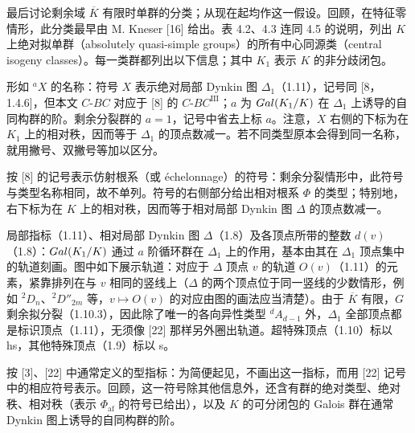 最后讨论剩余域 $\overline K$ 有限时单群的分类；从现在起均作这一假设。回顾，在特征零情形，此分类最早由 M. Kneser [16] 给出。表 4.2、4.3 连同 4.5 的说明，列出 $K$ 上绝对拟单群（absolutely quasi-simple groups）的所有中心同源类（central isogeny classes）。每一类群都列出以下信息；其中 $K_1$ 表示 $K$ 的非分歧闭包。

形如 ${}^aX$ 的名称：符号 $X$ 表示绝对局部 Dynkin 图 $\Delta_1$（1.11），记号同 [8，1.4.6]，但本文 $C$-$BC$ 对应于 [8] 的 $C$-$BC^{\mathrm{III}}$；$a$ 为 $Gal(K_1/K)$ 在 $\Delta_1$ 上诱导的自同构群的阶。剩余分裂群的 $a=1$，记号中省去上标 $a$。注意，$X$ 右侧的下标为在 $K_1$ 上的相对秩，因而等于 $\Delta_1$ 的顶点数减一。若不同类型原本会得到同一名称，就用撇号、双撇号等加以区分。

按 [8] 的记号表示仿射根系（或 échelonnage）的符号：剩余分裂情形中，此符号与类型名称相同，故不单列。符号的右侧部分给出相对根系 $\Phi$ 的类型；特别地，右下标为在 $K$ 上的相对秩，因而等于相对局部 Dynkin 图 $\Delta$ 的顶点数减一。

局部指标（1.11）、相对局部 Dynkin 图 $\Delta$（1.8）及各顶点所带的整数 $d(v)$（1.8）：$Gal(K_1/K)$ 通过 $a$ 阶循环群在 $\Delta_1$ 上的作用，基本由其在 $\Delta_1$ 顶点集中的轨道刻画。图中如下展示轨道：对应于 $\Delta$ 顶点 $v$ 的轨道 $O(v)$（1.11）的元素，紧靠排列在与 $v$ 相同的竖线上（$\Delta$ 的两个顶点位于同一竖线的少数情形，例如 ${}^2D_n$、${}^2D''_{2m}$ 等，$v\mapsto O(v)$ 的对应由图的画法应当清楚）。由于 $\overline K$ 有限，$G$ 剩余拟分裂（1.10.3），因此除了唯一的各向异性类型 ${}^dA_{d-1}$ 外，$\Delta_1$ 全部顶点都是标识顶点（1.11），无须像 [22] 那样另外圈出轨道。超特殊顶点（1.10）标以 hs，其他特殊顶点（1.9）标以 s。

按 [3]、[22] 中通常定义的型指标：为简便起见，不画出这一指标，而用 [22] 记号中的相应符号表示。回顾，这一符号除其他信息外，还含有群的绝对类型、绝对秩、相对秩（表示 $\Phi_{\mathrm{af}}$ 的符号已给出），以及 $K$ 的可分闭包的 Galois 群在通常 Dynkin 图上诱导的自同构群的阶。

